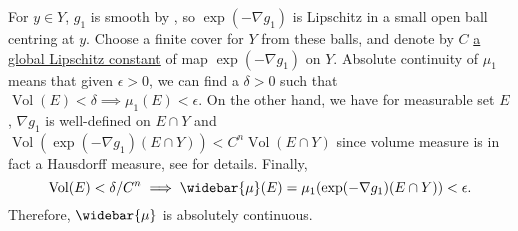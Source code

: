 For $y \in Y$, $g_1$ is smooth by ,
so $\exp( - \nabla g_1)$ is Lipschitz in a small open ball centring at $y$.
Choose a finite cover for $Y$ from these balls,
and denote by $C$ \underline{a global Lipschitz constant} of map \(\exp(-\nabla g_1)\) on $Y$.
Absolute continuity of $\mu_1$ means that given $\epsilon > 0$,
we can find a $\delta > 0$ such that $ \operatorname{Vol}(E) < \delta \implies \mu_1(E) < \epsilon$.
On the other hand, we have for measurable set $E$,
$\nabla g_1$ is well-defined on $E \cap Y$ and
$\operatorname{Vol}( \exp(- \nabla g_1 )( E \cap Y )) < C^n \operatorname{Vol}(E \cap Y)$
since volume measure is in fact a Hausdorff measure,
see \cite[Propositions 12.6 and 12.12]{TaylorMichaelEugene1946} for details.
Finally,
\begin{equation}
	\label{equa:absolutely_continuity_estimation}
	 \operatorname{Vol}(E) < \delta / C^n \implies \widebar{\mu}(E)
	=\mu_1(\exp(-\nabla g_1)(E \cap Y)) < \epsilon.
\end{equation}
Therefore, $\widebar{\mu}$ is absolutely continuous.
